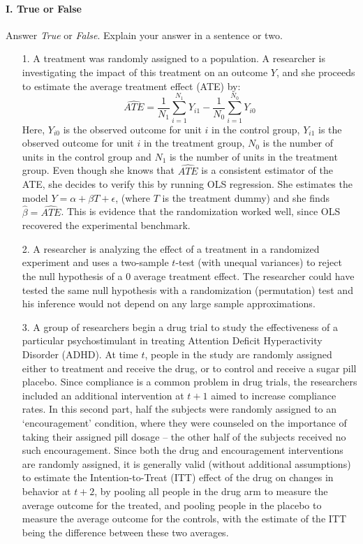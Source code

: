 \documentclass{article}
\begin{document}
\paragraph{\Large I. True or False}
Answer {\em True} or {\em False}.  Explain your answer in a sentence or two.
\begin{itemize}
\item[1.]  A treatment was randomly assigned to a population. A
  researcher is investigating the impact of this treatment on an
  outcome $Y$, and she proceeds to estimate the average treatment
  effect (ATE) by: 
$$\widehat{ATE} = \frac{1}{N_1}\sum_{i=1}^{N_1}Y_{i1} -
  \frac{1}{N_0}\sum_{i=1}^{N_0}Y_{i0}$$ Here, $Y_{i0}$ is the observed
  outcome for unit $i$ in the control group, $Y_{i1}$ is the observed
  outcome for unit $i$ in the treatment group, $N_0$ is the number of
  units in the control group and $N_1$ is the number of units in the
  treatment group. Even though she knows that $\widehat{ATE}$ is a
  consistent estimator of the ATE, she decides to verify this by
  running OLS regression.  She estimates the model $Y = \alpha + \beta
  T + \epsilon$, (where $T$ is the treatment dummy) and she finds $\hat{\beta} =
\widehat{ATE}$. This is evidence that the randomization worked well, since OLS
  recovered the experimental benchmark.
\item[2.]  A researcher is analyzing the effect of a treatment in a
  randomized experiment and uses a two-sample $t$-test (with unequal
  variances) to reject the null hypothesis of a 0 average treatment
  effect. The researcher could have tested the same null hypothesis
  with a randomization (permutation) test and his inference would not
  depend on any large sample approximations.

\item[3.] A group of researchers begin a drug trial to study the
  effectiveness of a particular psychostimulant in treating Attention
  Deficit Hyperactivity Disorder (ADHD).  At time $t$, people in the
  study are randomly assigned either to treatment and receive the
  drug, or to control and receive a sugar pill placebo. Since
  compliance is a common problem in drug trials, the researchers
  included an additional intervention at $t+1$ aimed to increase
  compliance rates.  In this second part, half the subjects were
  randomly assigned to an `encouragement' condition, where they were
  counseled on the importance of taking their assigned pill dosage --
  the other half of the subjects received no such encouragement.
  Since both the drug and encouragement interventions are randomly
  assigned, it is generally valid (without additional assumptions) to
  estimate the Intention-to-Treat (ITT) effect of the drug on changes
  in behavior at $t+2$, by pooling all people in the drug arm to
  measure the average outcome for the treated, and pooling people in
  the placebo to measure the average outcome for the controls, with
  the estimate of the ITT being the difference between these two
  averages.

\end{itemize}
\end{document}
